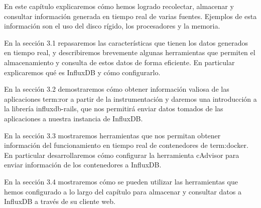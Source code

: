 En este capítulo explicaremos cómo hemos logrado recolectar, almacenar y
consultar información generada en tiempo real de varias fuentes. Ejemplos de
esta información son el uso del disco rígido, los procesadores y la memoria.

En la sección 3.1 repasaremos las características que tienen los datos generados
en tiempo real, y describiremos brevemente algunas herramientas que permiten el
almacenamiento y consulta de estos datos de forma eficiente. En particular
explicaremos qué es InfluxDB y cómo configurarlo.

En la sección 3.2 demostraremos cómo obtener información valiosa de las
aplicaciones \gls{term:ror} a partir de la instrumentación y daremos una
introducción a la librería influxdb-rails, que nos permitirá enviar datos
tomados de las aplicaciones a nuestra instancia de InfluxDB.

En la sección 3.3 mostraremos herramientas que nos permitan obtener información
del funcionamiento en tiempo real de contenedores de \gls{term:docker}. En
particular desarrollaremos cómo configurar la herramienta cAdvisor para enviar
información de los contenedores a InfluxDB.

En la sección 3.4 mostraremos cómo se pueden utilizar las herramientas que hemos
configurado a lo largo del capítulo para almacenar y consultar datos a InfluxDB
a través de su cliente web.
